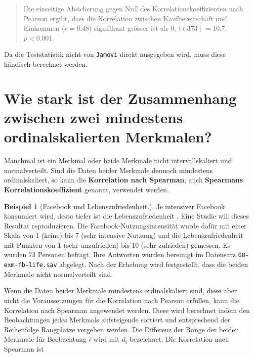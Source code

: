 \documentclass[
]{book}
\theoremstyle{definition}
\theoremstyle{definition}
\newtheorem{example}{Beispiel}[chapter]
\theoremstyle{definition}
\theoremstyle{definition}
\theoremstyle{remark}
\begin{document}
\begin{quote}
Die einseitige Absicherung gegen Null des Korrelationskoeffizienten nach Pearson ergibt, dass die Korrelation zwischen Kaufbereitschaft und Einkommen (\(r = 0.48\)) signifikant grösser ist als \(0\), \(t(373) = 10.7\), \(p < 0.001\).
\end{quote}

Da die Teststatistik nicht von \texttt{Jamovi} direkt ausgegeben wird, muss diese händisch berechnet werden.

\section{Wie stark ist der Zusammenhang zwischen zwei mindestens ordinalskalierten Merkmalen?}\label{wie-stark-ist-der-zusammenhang-zwischen-zwei-mindestens-ordinalskalierten-merkmalen}

Manchmal ist ein Merkmal oder beide Merkmale nicht intervallskaliert und normalverteilt. Sind die Daten beider Merkmale dennoch mindestens ordinalskaliert, so kann die \label{customdef-spearman-korrelation}{\textbf{Korrelation nach Spearman}}, auch \textbf{Spearmans Korrelationskoeffizient} genannt, verwendet werden.

\begin{example}[Facebook und Lebenszufriedenheit.]
\protect\hypertarget{exm:fb-life}{}\label{exm:fb-life}Je intensiver Facebook konsumiert wird, desto tiefer ist die Lebenszufriedenheit \citep{blachnio2016}. Eine Studie will dieses Resultat reproduzieren. Die Facebook-Nutzungsintensität wurde dafür mit einer Skala von \(1\) (keine) bis \(7\) (sehr intensive Nutzung) und die Lebenszufriedenheit mit Punkten von \(1\) (sehr unzufrieden) bis \(10\) (sehr zufrieden) gemessen. Es wurden \(73\) Personen befragt. Ihre Antworten wurden bereinigt im Datensatz \texttt{08-exm-fb-life.sav} abgelegt. Nach der Erhebung wird festgestellt, dass die beiden Merkmale nicht normalverteilt sind.
\end{example}

Wenn die Daten beider Merkmale mindestens ordinalskaliert sind, diese aber nicht die Voraussetzungen für die Korrelation nach Pearson erfüllen, kann die Korrelation nach Spearman angewendet werden. Diese wird berechnet indem den Beobachtungen jedes Merkmals aufsteigende sortiert und entsprechend der Reihenfolge Rangplätze vergeben werden. Die Differenz der Ränge der beiden Merkmale für Beobachtung \(i\) wird mit \(d_i\) bezeichnet. Die Korrelation nach Spearman ist
\end{document}
